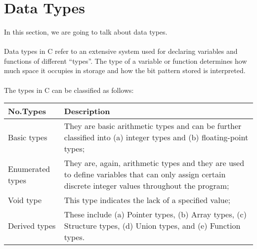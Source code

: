 \section{Data Types}

\paragraph{}
   In this section, we are going to talk about data types.

\paragraph{}
   \begin{displayquote}
      Data types in C refer to an extensive system used for declaring variables and functions of different ``types''. The type of a variable or
      function determines how much space it occupies in storage and how the bit pattern stored is interpreted.
   \end{displayquote}

\paragraph{}
   The types in C can be classified as follows:
   \begin{center}
      \begin{tabular}{ ||p{2in}| p{4in}|| }
         \hline
         No.Types & Description \\ [1.5ex]
         \hline\hline
         Basic types & They are basic arithmetic types and can be further classified into (a) integer types and (b) floating-point types;\\
         \hline
         Enumerated types & They are, again, arithmetic types and they are used to define variables that can only assign certain discrete integer
         values throughout the program;\\
         \hline
         Void type & This type indicates the lack of a specified value;\\
         \hline
         Derived types & These include (a) Pointer types, (b) Array types, (c) Structure types, (d) Union types, and (e) Function types.\\
         \hline
      \end{tabular}
   \end{center}

\newpage

